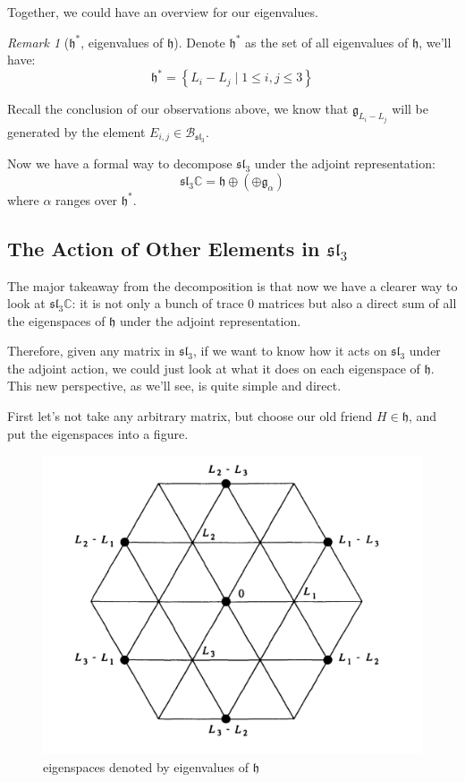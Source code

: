 \documentclass[a4paper]{article}
\newcommand{\C}{\mathbb{C}}
\theoremstyle{bfnote} %
\theoremstyle{bfnote}                  %
\theoremstyle{example}                       %
\theoremstyle{remark}                       %
\newtheorem{rem}[thm]{Remark}
\numberwithin{equation}{section}
\begin{document}
Together, we could have an overview for our eigenvalues.

\begin{rem}[$\mathfrak{h}^*$, eigenvalues of  $\mathfrak{h}$] 
	Denote $\mathfrak{h}^*$ as the set of all eigenvalues of  $\mathfrak{h}$, we'll have:  \[
		\mathfrak{h}^* = \left\{ L_i - L_j \mid 1\le  i,j \le 3\right\} 
	\] 
\end{rem}
Recall the conclusion of our observations above, we know that $\mathfrak{g}_{L_i-L_j}$ will be generated by the element $E_{i,j} \in \mathcal{B}_{\mathfrak{sl}_3}$.

Now we have a formal way to decompose $\mathfrak{sl}_3$ under the adjoint representation:  \begin{equation}
	\mathfrak{sl}_3\C = \mathfrak{h} \oplus \left( \oplus \mathfrak{g}_{\alpha} \right) 
\end{equation}  where $\alpha$ ranges over  $\mathfrak{h}^*$.

\subsection{The Action of Other Elements in $\mathfrak{sl}_3$}

The major takeaway from the decomposition is that now we have a clearer way to look at $\mathfrak{sl}_3\C$: it is not only a bunch of trace  $0$ matrices but also a direct sum of all the eigenspaces of  $\mathfrak{h}$ under the adjoint representation.

Therefore, given any matrix in  $\mathfrak{sl}_3$, if we want to know how it acts on  $\mathfrak{sl}_3$ under the adjoint action, we could just look at what it does on each eigenspace of  $\mathfrak{h}$. This new perspective, as we'll see, is quite simple and direct.

First let's not take any arbitrary matrix, but choose our old friend $H \in \mathfrak{h}$, and put the eigenspaces into a figure.

\begin{figure}[h!]
 \centering
 \includegraphics[width=3 in]{eigenvalue}
 \caption{eigenspaces denoted by eigenvalues of $\mathfrak{h}$}
 \label{eigenvalue}
 \end{figure}
\end{document}
